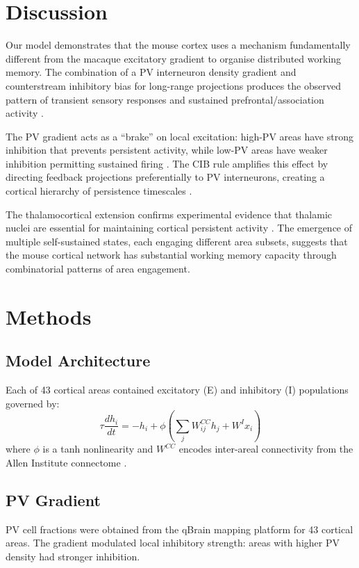 \documentclass[11pt]{article}
\begin{document}
\section{Discussion}

Our model demonstrates that the mouse cortex uses a mechanism fundamentally different from the macaque excitatory gradient to organise distributed working memory. The combination of a PV interneuron density gradient and counterstream inhibitory bias for long-range projections produces the observed pattern of transient sensory responses and sustained prefrontal/association activity \citep{li2020robust, guo2014flow, inagaki2019discrete}.

The PV gradient acts as a ``brake'' on local excitation: high-PV areas have strong inhibition that prevents persistent activity, while low-PV areas have weaker inhibition permitting sustained firing \citep{wang2020macroscopic, vafidis2022learning}. The CIB rule amplifies this effect by directing feedback projections preferentially to PV interneurons, creating a cortical hierarchy of persistence timescales \citep{joglekar2018inter, mejias2022feedforward}.

The thalamocortical extension confirms experimental evidence that thalamic nuclei are essential for maintaining cortical persistent activity \citep{guo2017maintenance, schmitt2017thalamic}. The emergence of multiple self-sustained states, each engaging different area subsets, suggests that the mouse cortical network has substantial working memory capacity through combinatorial patterns of area engagement.

\section{Methods}

\subsection{Model Architecture}
Each of 43 cortical areas contained excitatory (E) and inhibitory (I) populations governed by:
\begin{equation}
\tau \frac{dh_i}{dt} = -h_i + \phi\left(\sum_j W_{ij}^{CC} h_j + W^I x_i\right)
\end{equation}
where $\phi$ is a tanh nonlinearity and $W^{CC}$ encodes inter-areal connectivity from the Allen Institute connectome \citep{oh2014mesoscale}.

\subsection{PV Gradient}
PV cell fractions were obtained from the qBrain mapping platform \citep{kim2017intersectional} for 43 cortical areas. The gradient modulated local inhibitory strength: areas with higher PV density had stronger inhibition.
\end{document}
